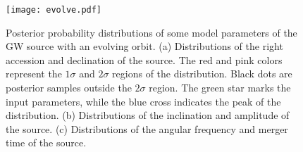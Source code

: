 \documentclass[times,tight]{aastex631}
\begin{document}
\begin{figure}
    \centering
    \texttt{[image: evolve.pdf]}
    \caption{Posterior probability distributions of some model parameters of the GW source with an evolving orbit.
    (a) Distributions of the right accession and declination of the source.
    The red and pink colors represent the $1\sigma$ and $2\sigma$ regions of the distribution.
    Black dots are posterior samples outside the $2\sigma$ region.
    The green star marks the input parameters, while the blue cross indicates the peak of the distribution.
    (b) Distributions of the inclination and amplitude of the source.
    (c) Distributions of the angular frequency and merger time of the source.
    \label{fig:evolve}}
\end{figure}

\newcommand{\noop}[1]{}
\end{document}
